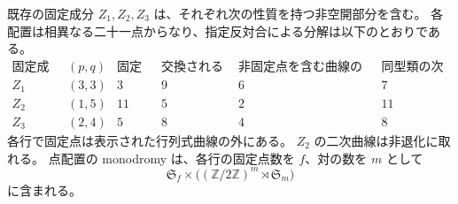 \begin{theorem}[三つの自己反対族の被約点配置]
\label{thm:all-self-opposite-configurations-v24}
既存の固定成分 $Z_1,Z_2,Z_3$ は、それぞれ次の性質を持つ非空開部分を含む。
各配置は相異なる二十一点からなり、指定反対合による分解は以下のとおりである。
\[
\begin{array}{c|c|c|c|c|c}
 \text{固定成分}&(p,q)&\text{固定点}&\text{交換される対}&
 \text{非固定点を含む曲線の次数}&\text{同型類の次元}\\\hline
 Z_1&(3,3)&3&9&6&7\\
 Z_2&(1,5)&11&5&2&11\\
 Z_3&(2,4)&5&8&4&8
\end{array}
\]
各行で固定点は表示された行列式曲線の外にある。
$Z_2$ の二次曲線は非退化に取れる。
点配置の monodromy は、各行の固定点数を $f$、対の数を $m$ として
\[
 \mathfrak S_f\times\bigl((\mathbb Z/2\mathbb Z)^m\rtimes\mathfrak S_m\bigr)
\]
に含まれる。
\end{theorem}
